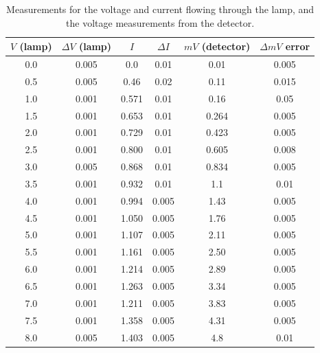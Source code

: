 \documentclass[%
 reprint,
superscriptaddress,
 amsmath,amssymb,
 aps,
]{revtex4-1}
\begin{document}
\begin{table}[b]
    \begin{tabular}{cccccc}
        \hline\hline
        $V$ (lamp) & $\Delta V$ (lamp) & $I$ & $\Delta I$ & $mV$ (detector) & $\Delta mV$ error \\  \hline
        0.0 & 0.005 & 0.0 & 0.01 & 0.01 & 0.005 \\
        0.5 & 0.005 & 0.46 & 0.02 & 0.11 & 0.015 \\
        1.0 & 0.001 & 0.571 & 0.01 & 0.16 & 0.05 \\
        1.5 & 0.001 & 0.653 & 0.01 & 0.264 & 0.005 \\
        2.0 & 0.001 & 0.729 & 0.01 & 0.423 & 0.005 \\
        2.5 & 0.001 & 0.800 & 0.01 & 0.605 & 0.008 \\
        3.0 & 0.005 & 0.868 & 0.01 & 0.834 & 0.005 \\
        3.5 & 0.001 & 0.932 & 0.01 & 1.1 & 0.01 \\
        4.0 & 0.001 & 0.994 & 0.005 & 1.43 & 0.005 \\
        4.5 & 0.001 & 1.050 & 0.005 & 1.76 & 0.005 \\
        5.0 & 0.001 & 1.107 & 0.005 & 2.11 & 0.005 \\
        5.5 & 0.001 & 1.161 & 0.005 & 2.50 & 0.005 \\
        6.0 & 0.001 & 1.214 & 0.005 & 2.89 & 0.005 \\
        6.5 & 0.001 & 1.263 & 0.005 & 3.34 & 0.005 \\
        7.0 & 0.001 & 1.211 & 0.005 & 3.83 & 0.005 \\
        7.5 & 0.001 & 1.358 & 0.005 & 4.31 & 0.005 \\
        8.0 & 0.005 & 1.403 & 0.005 & 4.8 & 0.01 \\ \hline \hline
    \end{tabular}
    \caption{Measurements for the voltage and current flowing through the lamp, and the voltage measurements from the detector.}
    \label{hightemp-data}
\end{table}
\end{document}
